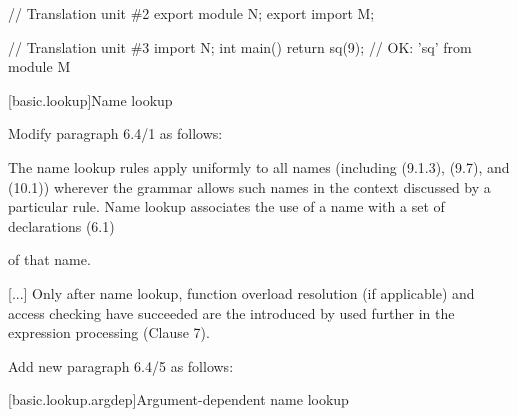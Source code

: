 \begin{std.txt}
\begin{codeblock}
    // Translation unit \#2
    export module N;
    export import M;

    // Translation unit \#3
    import N;
    int main() { return sq(9); }       // OK: 'sq' from module M
    \end{codeblock}
    \exitexample
\end{std.txt}


\setcounter{section}{3}
[basic.lookup]{Name lookup}

Modify paragraph 6.4/1 as follows:
\begin{std.txt}
  \resetalinea[0]
  \alinea
  The name lookup rules apply uniformly to all names
  (including  (9.1.3),
   (9.7), and 
   (10.1))
  wherever the grammar allows such names in the context discussed by a 
  particular rule.
  Name lookup associates the use of a name with a set of declarations (6.1)
\begin{before}
\end{before}
  of that name.
\begin{before}
\end{before}
  [...] Only after name lookup, function overload resolution (if applicable)
  and access checking have succeeded are the
   introduced by
  used further in the expression processing (Clause 7).
\end{std.txt}

\begin{before}
Add new paragraph 6.4/5 as follows:
\begin{std.txt}\color{addclr}
  \resetalinea[4]
  \alinea
\end{std.txt}
\end{before}

\setcounter{subsection}{1}
[basic.lookup.argdep]{Argument-dependent name lookup}

